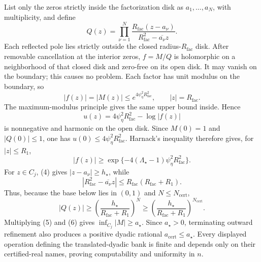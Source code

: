 List only the zeros strictly inside the factorization disk as \(a_1,\ldots,a_N\), with multiplicity, and define
\[
 Q(z)=\prod_{\nu=1}^N
 \frac{R_{\mathrm{fac}}(z-a_\nu)}
      {R_{\mathrm{fac}}^2-\overline{a_\nu}z}.
\]
Each reflected pole lies strictly outside the closed radius-\(R_{\mathrm{fac}}\) disk.  After removable cancellation at the interior zeros, \(f=M/Q\) is holomorphic on a neighborhood of that closed disk and zero-free on its open disk.  It may vanish on the boundary; this causes no problem.  Each factor has unit modulus on the boundary, so
\[
 |f(z)|=|M(z)|\le e^{4\psi_{\eta}^2R_{\mathrm{fac}}^2},
 \qquad |z|=R_{\mathrm{fac}}.
\]
The maximum-modulus principle gives the same upper bound inside.  Hence
\[
 u(z)=4\psi_{\eta}^2R_{\mathrm{fac}}^2-\log|f(z)|
\]
is nonnegative and harmonic on the open disk.  Since \(M(0)=1\) and \(|Q(0)|\le1\), one has \(u(0)\le4\psi_{\eta}^2R_{\mathrm{fac}}^2\).  Harnack's inequality therefore gives, for \(|z|\le R_1\),
\[
 |f(z)|\ge
 \exp\{-4(\Lambda_{\star}-1)\psi_{\eta}^2R_{\mathrm{fac}}^2\}. \tag{5}
\]
For \(z\in C_j\), (4) gives \(|z-a_\nu|\ge h_{\star}\), while
\[
 |R_{\mathrm{fac}}^2-\overline{a_\nu}z|
 \le R_{\mathrm{fac}}(R_{\mathrm{fac}}+R_1).
\]
Thus, because the base below lies in \((0,1)\) and \(N\le N_{\mathrm{cert}}\),
\[
 |Q(z)|\ge
 \left(\frac{h_{\star}}{R_{\mathrm{fac}}+R_1}\right)^N
 \ge
 \left(\frac{h_{\star}}{R_{\mathrm{fac}}+R_1}\right)^{N_{\mathrm{cert}}}. \tag{6}
\]
Multiplying (5) and (6) gives \(\inf_{C_j}|M|\ge a_{\star}\).  Since \(a_{\star}>0\), terminating outward refinement also produces a positive dyadic rational \(a_{\mathrm{cert}}\le a_{\star}\).  Every displayed operation defining the translated-dyadic bank is finite and depends only on their certified-real names, proving computability and uniformity in \(n\).